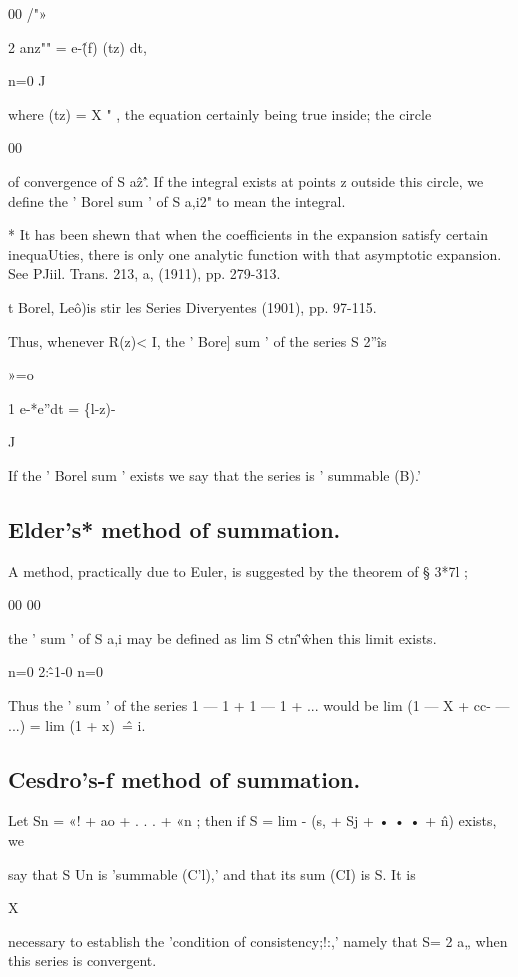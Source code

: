 00 /"»

2 anz"" = e-\^(f) (tz) dt,

n=0 J

where (tz) = X " , the equation certainly being true inside; the circle

00

of convergence of S a\^z'\^. If the integral exists at points z outside this
circle, we define the ' Borel sum ' of S a,i2" to mean the integral.

* It has been shewn that when the coefficients in the expansion satisfy certain inequaUties,
there is only one analytic function with that asymptotic expansion. See PJiil. Trans. 213, a,
(1911), pp. 279-313.

t Borel, Le\^o)is stir les Series Diveryentes (1901), pp. 97-115.



%
%


Thus, whenever R(z)< I, the ' Bore] sum ' of the series S 2''\^ is

»=o

1 e-*e''dt = \{l-z)-\

J

If the ' Borel sum ' exists we say that the series is ' summable (B).'

\subsection{Elder's* method of summation.}

A method, practically due to Euler, is suggested by the theorem of § 3*7l ;

00 00

the ' sum ' of S a,i may be defined as lim S ctn\^'\^ when this limit exists.

n=0 2:\^-1-0 n=0

Thus the ' sum ' of the series 1 — 1 + 1 — 1 + ... would be
lim (1 — X + cc- — ...) = lim (1 + x)~\^ = i.

\subsection{Cesdro's-f method of summation.}

Let Sn = «! + ao + . . . + «n ; then if S = lim - (s, + Sj + • • • + \^n) exists, we

say that S Un is 'summable (C'l),' and that its sum (CI) is S. It is

X

necessary to establish the 'condition of consistency;!:,' namely that S= 2 a„
when this series is convergent.

